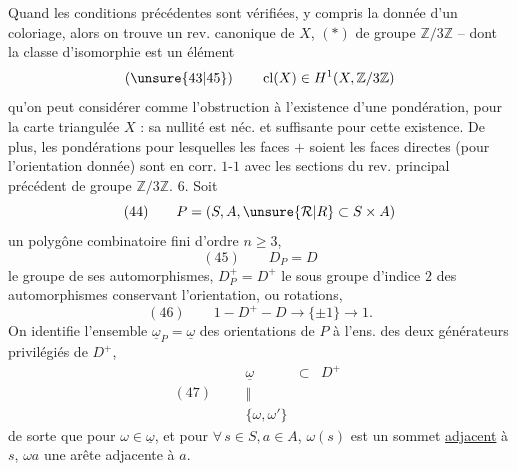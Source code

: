 Quand  les conditions précédentes sont vérifiées, y compris la donnée d'un  coloriage, alors on trouve un rev.  canonique   de $X$, $(*)$ de groupe $\mathbb Z/3\mathbb Z$ -- dont la classe d'isomorphie est un élément
\[
(\unsure{43|45})\qquad \operatorname{cl}(X)\in H^1(X,\mathbb Z/3\mathbb Z)
\]
qu'on peut considérer comme l'obstruction à l'existence d'une pondération, pour la carte triangulée $X$ : sa nullité est néc. et suffisante pour cette existence. De plus, les pondérations pour lesquelles les faces $+$ soient les faces directes (pour l'orientation donnée) sont en corr. $1$-$1$ avec les sections du  rev. principal précédent de groupe $\mathbb Z/3\mathbb Z$.
6. Soit
\[
(44)\qquad P=(S,A,\unsure{\mathcal R|R}\subset S\times A)
\]
un polygône combinatoire fini d'ordre $n\geq3$,
\[
(45)\qquad D_P=D
\]
le groupe de ses automorphismes, $D_P^+=D^+$ le sous groupe d'indice $2$ des automorphismes conservant l'orientation, ou rotations,
\[
(46)\qquad 1\mathbin{-}D^+\mathbin{-}D\longrightarrow\{\pm1\}\longrightarrow1.
\]
On identifie l'ensemble $\underline\omega_P=\underline\omega$ des orientations de $P$ à l'ens. des deux générateurs privilégiés de $D^+$, 
\[
(47)\qquad
\begin{array}{ccc}
\underline\omega&\subset&D^+\\
\Vert&&\\[-2pt]
\{\omega,\omega'\}&&
\end{array}
\]
de sorte que pour $\omega\in\underline\omega$, et pour $\forall\,s\in S,a\in A$, $\omega(s)$ est un sommet \uline{adjacent} à $s$, $\omega a$ une arête adjacente à $a$.

